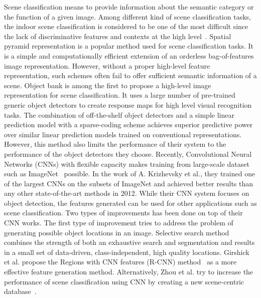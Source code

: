 
Scene classification means to provide information about the semantic category
or the function of a given image. Among different kind of scene classification
tasks, the indoor scene classification is considered to be one of the most
difficult since the lack of discriminative features and contexts at the high
level~\cite{Quattoni:2009:RIS}. Spatial pyramid
representation\cite{Lazebnik:2006:BBF} is a popular method used for scene
classification tasks. It is a simple and computationally efficient extension of
an orderless bag-of-features image representation. However, without a proper
high-level feature representation, such schemes often fail to offer sufficient
semantic information of a scene. Object bank\cite{Li:2010:OBA} is among the
first to propose a high-level image representation for scene classification. It
uses a large number of pre-trained generic object detectors to create response
maps for high level visual recognition tasks. The combination of off-the-shelf
object detectors and a simple linear prediction model with a sparse-coding
scheme achieves superior predictive power over similar linear prediction models
trained on conventional representations. However, this method also limits the
performance of their system to the performance of the object detectors they
choose. Recently, Convolutional Neural Networks (CNNs) with flexible capacity
makes training from large-scale dataset such as ImageNet~\cite{Deng:2009:IAL}
possible. In the work of A. Krizhevsky et al.\cite{Krizhevsky:2012:ICD}, they
trained one of the largest CNNs on the subsets of ImageNet and achieved better
results than any other state-of-the-art methods in 2012. While their CNN system
focuses on object detection, the features generated can be used for other
applications such as scene classification. Two types of improvements has been
done on top of their CNN works. The first type of improvement tries to address
the problem of generating possible object locations in an image. Selective
search method~\cite{Uijlings:2013:SSO} combines the strength of both an
exhaustive search and segmentation and results in a small set of data-driven,
class-independent, high quality locations. Girshick et al. propose the Regions
with CNN features (R-CNN) method~\cite{Girshick:2013:RFH} as a more effective
feature generation method. Alternatively, Zhou et al. try to increase the
performance of scene classification using CNN by creating a new scene-centric
database~\cite{Zhou:2014:LDF}.

